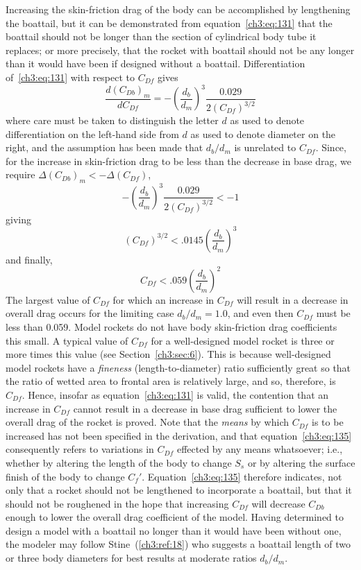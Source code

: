 Increasing the skin-friction drag of the body can be accomplished by
lengthening the boattail, but it can be demonstrated from
equation~\eqref{ch3:eq:131} that the boattail should not be longer than the
section of cylindrical body tube it replaces; or more precisely, that the
rocket with boattail should not be any longer than it would have been if
designed without a boattail. Differentiation of~\eqref{ch3:eq:131} with
respect to $C_{Df}$ gives
\begin{equation}\label{ch3:eq:132}
\frac{d(C_{Db})_m}{dC_{Df}} = -\left(\frac{d_b}{d_m}\right)^{3}\frac{0.029}{2(C_{Df})^{3/2}}
\end{equation}
where care must be taken to distinguish the letter $d$ as used to denote
differentiation on the left-hand side from $d$ as used to denote diameter on
the right, and the assumption has been made that $d_b/d_m$ is unrelated to
$C_{Df}$. Since, for the increase in skin-friction drag to be less than the
decrease in base drag, we require $\Delta(C_{Db})_m < -\Delta(C_{Df})$,
\begin{equation}\label{ch3:eq:133}
-\left(\frac{d_b}{d_m}\right)^{3}\frac{0.029}{2(C_{Df})^{3/2}} < -1
\end{equation}
giving
\begin{equation}\label{ch3:eq:134}
(C_{Df})^{3/2} < .0145\left(\frac{d_b}{d_m}\right)^{3}
\end{equation}
and finally,
\begin{equation}\label{ch3:eq:135}
C_{Df} < .059\left(\frac{d_b}{d_m}\right)^{2}
\end{equation}
The largest value of $C_{Df}$ for which an increase in $C_{Df}$ will result in
a decrease in overall drag occurs for the limiting case $d_b/d_m = 1.0$, and
even then $C_{Df}$ must be less than 0.059. Model rockets do not have body
skin-friction drag coefficients this small. A typical value of $C_{Df}$ for a
well-designed model rocket is three or more times this value (see
Section~\ref{ch3:sec:6}). This is because well-designed model rockets have a
\emph{fineness} (length-to-diameter) ratio sufficiently great so that the
ratio of wetted area to frontal area is relatively large, and so, therefore,
is $C_{Df}$. Hence, insofar as equation~\eqref{ch3:eq:131} is valid, the
contention that an increase in $C_{Df}$ cannot result in a decrease in base
drag sufficient to lower the overall drag of the rocket is proved. Note that
the \emph{means} by which $C_{Df}$ is to be increased has not been specified
in the derivation, and that equation~\eqref{ch3:eq:135} consequently refers to
variations in $C_{Df}$ effected by any means whatsoever; i.e., whether by
altering the length of the body to change $S_s$ or by altering the surface
finish of the body to change $C_f'$. Equation~\eqref{ch3:eq:135} therefore
indicates, not only that a rocket should not be lengthened to incorporate a
boattail, but that it should not be roughened in the hope that increasing
$C_{Df}$ will decrease $C_{Db}$ enough to lower the overall drag coefficient of
the model. Having determined to design a model with a boattail no longer than
it would have been without one, the modeler may follow
Stine~(\ref{ch3:ref:18}) who suggests a boattail length of two or three body
diameters for best results at moderate ratios $d_b/d_m$.

